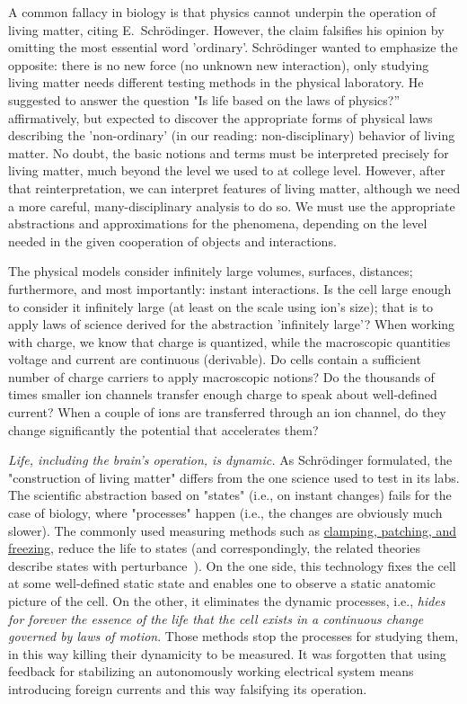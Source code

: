A common fallacy in biology is that \hypertarget{Physics}{physics} cannot underpin the operation of living matter, citing E.~Schrödinger. However, the claim falsifies his opinion by omitting the most essential word 'ordinary'. 
Schrödinger wanted to emphasize the opposite: there is no new force (no unknown new interaction), only studying living matter needs different testing methods in the physical laboratory. He suggested to answer the question
"Is life based on the laws of physics?” affirmatively, but expected to discover the appropriate forms of physical laws describing the 'non-ordinary' (in our reading: non-disciplinary) behavior of living matter. No doubt, the basic notions and terms must be interpreted precisely for living matter,
much beyond the level we used to at college level.
However, after that reinterpretation, we can interpret features of living matter, although we need a more careful, many-disciplinary analysis to do so. 
We must use the appropriate abstractions and approximations for the phenomena,
depending on the level needed in the given cooperation of objects and interactions.

The physical models consider infinitely large volumes,
surfaces, distances; furthermore, and most importantly: instant interactions. Is the cell large enough to
consider it infinitely large (at least on the scale using ion's size); that is to apply laws of science
derived for the abstraction 'infinitely large'? 
When working with charge, we know that charge is quantized, while the macroscopic quantities voltage and current are 
continuous (derivable). Do cells contain a sufficient 
number of charge carriers to apply macroscopic notions?
Do the thousands of times smaller ion channels transfer enough charge
to speak about well-defined current?
When a couple of ions are transferred through an ion channel,
do they change significantly the potential that accelerates them?


\textit{Life, including the brain's operation, is dynamic.} 
As Schrödinger formulated, the "construction of living matter" differs
from the one science used to test in its labs.
The scientific abstraction based on "states" (i.e., on instant changes)
fails for the case of biology, where "processes" happen (i.e., the changes
are obviously much slower).
 The commonly used measuring methods such as \hyperlink{voltage-clamping}{clamping, patching, and freezing},  reduce the life to states (and correspondingly, 
 the related theories describe states with perturbance~\cite{PerturbationNeuralComputation:2002}). 
On the one side, this technology fixes the cell at some well-defined static state and enables one to observe a static anatomic picture of the cell. On the other,
it eliminates the dynamic processes, i.e., \textit{hides for forever the essence of the life that the cell exists in a continuous change governed by laws of motion}.
Those methods stop the processes for studying them, in this way killing their dynamicity to be measured.
It was forgotten that using feedback for stabilizing an autonomously
working electrical system means introducing foreign currents
and this way falsifying its operation. 

